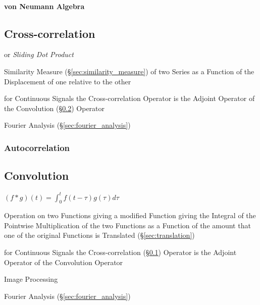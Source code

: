 \paragraph{von Neumann Algebra}\label{sec:vonneumann_algebra}\hfill



\subsection{Cross-correlation}\label{sec:cross_correlation}

or \emph{Sliding Dot Product}

Similarity Measure (\S\ref{sec:similarity_measure}) of two Series as a Function
of the Displacement of one relative to the other

for Continuous Signals the Cross-correlation Operator is the Adjoint Operator
of the Convolution (\S\ref{sec:convolution}) Operator

\fist Fourier Analysis (\S\ref{sec:fourier_analysis})



\subsubsection{Autocorrelation}\label{sec:autocorrelation}



\subsection{Convolution}\label{sec:convolution}

$(f * g)(t) = \int_0^t f(t-\tau) g(\tau) d\tau$

Operation on two Functions giving a modified Function giving the Integral of
the Pointwise Multiplication of the two Functions as a Function of the amount
that one of the original Functions is Translated (\S\ref{sec:translation})

for Continuous Signals the Cross-correlation (\S\ref{sec:cross_correlation})
Operator is the Adjoint Operator of the Convolution Operator

Image Processing

\fist Fourier Analysis (\S\ref{sec:fourier_analysis})

